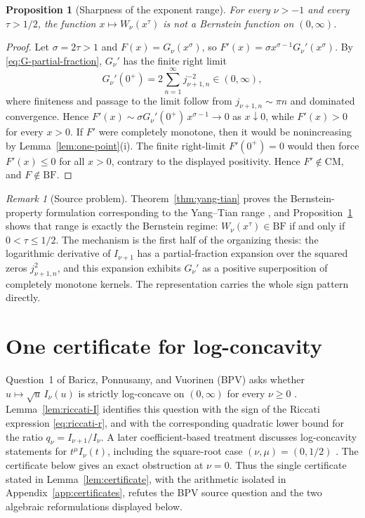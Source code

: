 \documentclass[preprint,12pt]{elsarticle}
\theoremstyle{plain}
\newtheorem{proposition}[theorem]{Proposition}
\theoremstyle{definition}
\theoremstyle{remark}
\newtheorem{remark}[theorem]{Remark}
\newcommand{\CM}{\mathrm{CM}}
\newcommand{\BF}{\mathrm{BF}}
\begin{document}
\begin{proposition}[Sharpness of the exponent range]\label{prop:sharpness}
For every \(\nu>-1\) and every \(\tau>1/2\), the function
\(x\mapsto W_\nu(x^\tau)\) is not a Bernstein function on \((0,\infty)\).
\end{proposition}
\begin{proof}
Let \(\sigma=2\tau>1\) and \(F(x)=G_\nu(x^{\sigma})\), so
\(F'(x)=\sigma x^{\sigma-1}G_\nu'(x^{\sigma})\). By \eqref{eq:G-partial-fraction}, \(G_\nu'\) has the finite right limit
\begin{equation}
G_\nu'(0^+)=2\sum_{n=1}^{\infty}j_{\nu+1,n}^{-2}\in(0,\infty),
\end{equation}
where finiteness and passage to the limit follow from
\(j_{\nu+1,n}\sim\pi n\) and dominated convergence. Hence
\(F'(x)\sim\sigma G_\nu'(0^+)\,x^{\sigma-1}\to0\) as \(x\downarrow0\),
while \(F'(x)>0\) for every \(x>0\). If \(F'\) were completely monotone, then
it would be nonincreasing by Lemma~\ref{lem:one-point}(i). The finite
right-limit \(F'(0^+)=0\) would then force \(F'(x)\le0\) for all \(x>0\),
contrary to the displayed positivity. Hence \(F'\notin\CM\), and
\(F\notin\BF\).
\end{proof}

\begin{remark}[Source problem]
Theorem~\ref{thm:yang-tian} proves the Bernstein-property formulation
corresponding to the Yang--Tian range \cite[Conjecture~3]{yang-tian}, and
Proposition~\ref{prop:sharpness} shows that range is exactly the Bernstein
regime: \(W_\nu(x^\tau)\in\BF\) if and only if \(0<\tau\le1/2\). The
mechanism is the first half of the organizing thesis: the logarithmic
derivative of \(I_{\nu+1}\) has a partial-fraction expansion over the squared
zeros \(j_{\nu+1,n}^2\), and this expansion exhibits \(G_\nu'\) as a positive
superposition of completely monotone kernels. The representation carries the
whole sign pattern directly.
\end{remark}

\section{One certificate for log-concavity}
\label{sec:certificate-cluster}

Question~1 of Baricz, Ponnusamy, and Vuorinen (BPV) asks whether
\(u\mapsto\sqrt u\,I_\nu(u)\) is strictly log-concave on \((0,\infty)\) for
every \(\nu\ge0\) \cite[Question~1]{bpv}. Lemma~\ref{lem:riccati-I}
identifies this question with the sign of the Riccati expression
\eqref{eq:riccati-r}, and with the corresponding quadratic lower bound for
the ratio \(q_\nu=I_{\nu+1}/I_\nu\). A later coefficient-based treatment
discusses log-concavity statements for \(t^\mu I_\nu(t)\), including the
square-root case \((\nu,\mu)=(0,1/2)\) \cite[Theorem~4]{nanthanasub}. The
certificate below gives an exact obstruction at \(\nu=0\). Thus the single
certificate stated in Lemma~\ref{lem:certificate}, with the arithmetic
isolated in Appendix~\ref{app:certificates}, refutes the BPV source question
and the two algebraic reformulations displayed below.
\end{document}

